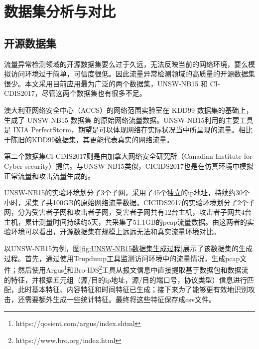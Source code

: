 
\chapter{数据集分析与对比}
\section{开源数据集}
流量异常检测领域的开源数据集要么过于久远，无法反映当前的网络环境，要么模拟访问环境过于简单，可信度很低。因此流量异常检测领域的高质量的开源数据集很少。本文采用目前应用最为广泛的两个数据集，UNSW-NB15 和 CI-
CDIS2017，尽管这两个数据集也有很多不足。

澳大利亚网络安全中心（ACCS）的网络范围实验室在 KDD99 数据集的基础上，生成了 UNSW-NB15 数据集\cite{moustafa2015unsw} 的原始网络流量数据。UNSW-NB15利用的主要工具是 IXIA PerfectStorm，期望是可以体现网络在实际状况当中所呈现的流量。相比于陈旧的KDD99数据集\cite{ozgur2016review}，其更能代表真实的网络流量。

第二个数据集CI-CDIS2017则是由加拿大网络安全研究所（Canadian Institute for Cyber-security）提供。与UNSW-NB15类似，CICIDS2017也是在仿真环境中模拟正常流量和攻击流量生成的。

UNSW-NB15的实验环境划分了3个子网，采用了45个独立的ip地址，持续约30个小时，采集了共100GB的原始网络流量数据。CICIDS2017的实验环境划分了2个子网，分为受害者子网和攻击者子网，受害者子网共有12台主机，攻击者子网共4台主机，累计测量时间持续约5天，共采集了51.1GB的pcap流量数据。由这两者的实验环境可以看出，开源数据集在规模上远远无法和真实流量环境对比。




以UNSW-NB15为例，图\ref{fig:UNSW-NB15数据集生成过程}展示了该数据集的生成过程。首先，通过使用Tcupdump工具监测访问环境中的流量情况，生成pcap文件；然后使用Argus\footnote{https://qosient.com/argus/index.shtml}和Bro-IDS\footnote{https://www.bro.org/index.html}工具从报文信息中直接提取基于数据包和数据流的特征，并根据五元组（源/目的ip地址，源/目的端口号，协议类型）信息进行匹配，此时基本特征、内容特征和时间特征已生成；接下来为了能够更有效地识别攻击，还需要额外生成一些统计特征。最终将这些特征保存成csv文件。



